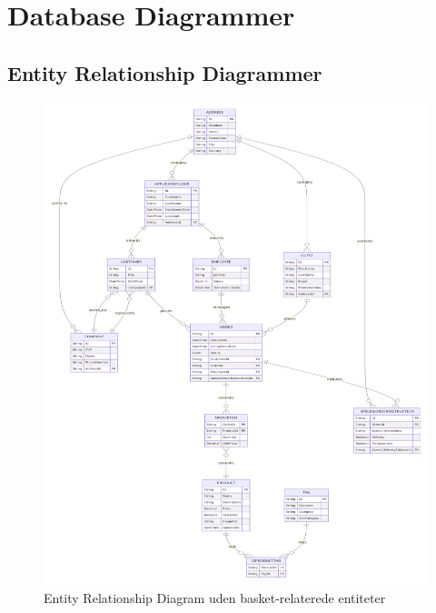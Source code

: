 \section{Database Diagrammer}

\subsection{Entity Relationship Diagrammer}
\label{appendix:entity-relationship-diagrams}
\begin{figure}
    \centering
    \includegraphics[width=1\textwidth]{figures/diagrams/erd-db-without-basket.png}
    \caption{Entity Relationship Diagram uden basket-relaterede entiteter}
    \label{fig:entity-relationship-diagram-nobasket}
\end{figure}

